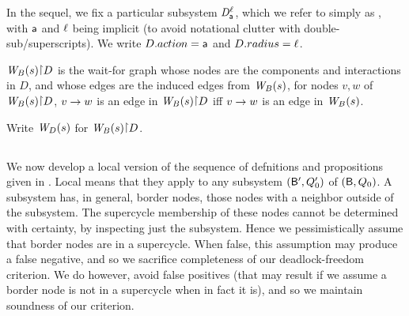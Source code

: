 In the sequel, we fix a particular subsystem $\dsk{\act}{\l}$, which
we refer to simply as \DS, with $\act$ and $\l$ being implicit (to
avoid notational clutter with double-sub/superscripts). 
We write $\DS.action = \act$ and $\DS.radius = \l$. 


\begin{definition} \label{defn:projWgraph}
$\wfg{B}{s} \pj \DS$ is the wait-for graph whose nodes are the
components and interactions in $D$, and whose edges are the induced
edges from $\wfg{B}{s}$, \ie for nodes $v, w$ of $\wfg{B}{s} \pj \DS$,
$v \ar w$ is an edge in $\wfg{B}{s} \pj \DS$ iff $v \ar w$ is an edge in $\wfg{B}{s}$.

Write $\lwfg{B}{s}{\DS}$ for $\wfg{B}{s} \pj \DS$.
\end{definition}


%
\subsection{}
\label{s:local.fixpoint}

We now develop a local version of the sequence of defnitions and propositions given in .  Local means that they apply to any
subsystem $(\B', Q'_0)$ of $(\B, Q_0)$. A subsystem has, in general, border nodes, \ie those nodes with a neighbor outside of the
subsystem. The supercycle membership of these nodes cannot be determined with certainty, by inspecting just the subsystem.
Hence we pessimistically assume that border nodes are in a supercycle. When false, this assumption may produce a false negative, and so we sacrifice
completeness of our deadlock-freedom criterion. We do however, avoid false positives (that may result if we assume a border node is not in a supercycle when in fact it
is), and so we maintain soundness of our criterion. 


